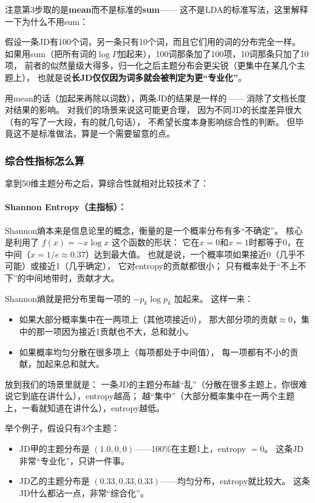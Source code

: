 \documentclass[12pt,a4paper]{ctexart}
\begin{document}
注意第3步取的是\textbf{mean}而不是标准的\textbf{sum}——
这不是LDA的标准写法，这里解释一下为什么不用sum：

假设一条JD有100个词，另一条只有10个词，而且它们用的词的分布完全一样。
如果用sum（把所有词的$\log P$加起来），100词那条加了100项，10词那条只加了10项，
前者的似然量级大得多，归一化之后主题分布会更尖锐（更集中在某几个主题上），
也就是说\textbf{长JD仅仅因为词多就会被判定为更``专业化''}。

用mean的话（加起来再除以词数），两条JD的结果是一样的——
消除了文档长度对结果的影响。
对我们的场景来说这可能更合理，
因为不同JD的长度差异很大（有的写了一大段，有的就几句话），
不希望长度本身影响综合性的判断。
但毕竟这不是标准做法，算是一个需要留意的点。

\subsubsection{综合性指标怎么算}

拿到50维主题分布之后，算综合性就相对比较技术了：

\paragraph{Shannon Entropy（主指标）：}

Shannon熵本来是信息论里的概念，衡量的是一个概率分布有多``不确定''。
核心是利用了 $f(x) = -x\log x$ 这个函数的形状：
它在$x=0$和$x=1$时都等于0，在中间（$x=1/e \approx 0.37$）达到最大值。
也就是说，一个概率项如果接近0（几乎不可能）或接近1（几乎确定），
它对entropy的贡献都很小；
只有概率处于``不上不下''的中间地带时，贡献才大。

Shannon熵就是把分布里每一项的 $-p_k \log p_k$ 加起来。
这样一来：
\begin{itemize}
\item 如果大部分概率集中在一两项上（其他项接近0），
那大部分项的贡献$\approx 0$，集中的那一项因为接近1贡献也不大，总和就小。
\item 如果概率均匀分散在很多项上（每项都处于中间值），
每一项都有不小的贡献，加起来总和就大。
\end{itemize}

放到我们的场景里就是：
一条JD的主题分布越``乱''（分散在很多主题上，你很难说它到底在讲什么），entropy越高；
越``集中''（大部分概率集中在一两个主题上，一看就知道在讲什么），entropy越低。

举个例子，假设只有3个主题：
\begin{itemize}
\item JD甲的主题分布是 $(1.0, 0, 0)$——100\%在主题1上，entropy $= 0$。
这条JD非常``专业化''，只讲一件事。
\item JD乙的主题分布是 $(0.33, 0.33, 0.33)$——均匀分布，entropy就比较大。
这条JD什么都沾一点，非常``综合化''。
\end{itemize}
\end{document}
